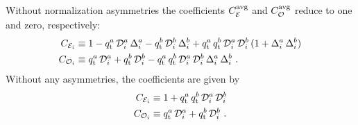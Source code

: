 Without \BsBsbar{} normalization asymmetries the coefficients $\avgCEven$ and $\avgCOdd$ reduce to one and zero, respectively:
\begin{subequations}
  \begin{align}
    \CEven[i] &\equiv 1
                      - \qt^a\,\dil[i]^a\,\ADilWTag[i]^a
                      - \qt^b\,\dil[i]^b\,\ADilWTag[i]^b
                      + \qt^a\,\qt^b\,\dil[i]^a\,\dil[i]^b\,(1 + \ADilWTag[i]^a\,\ADilWTag[i]^b) \\
    \COdd[i] &\equiv    \qt^a\,\dil[i]^a
                      + \qt^b\,\dil[i]^b
                      - \qt^a\,\qt^b\,\dil[i]^a\,\dil[i]^b\,\ADilWTag[i]^a\,\ADilWTag[i]^b \ .
  \end{align}
\end{subequations}
Without any asymmetries, the coefficients are given by
\begin{subequations}
  \begin{align}
    \CEven[i] &\equiv 1
                      + \qt^a\,\qt^b\,\dil[i]^a\,\dil[i]^b \\
    \COdd[i] &\equiv    \qt^a\,\dil[i]^a
                      + \qt^b\,\dil[i]^b \ .
  \end{align}
\end{subequations}
